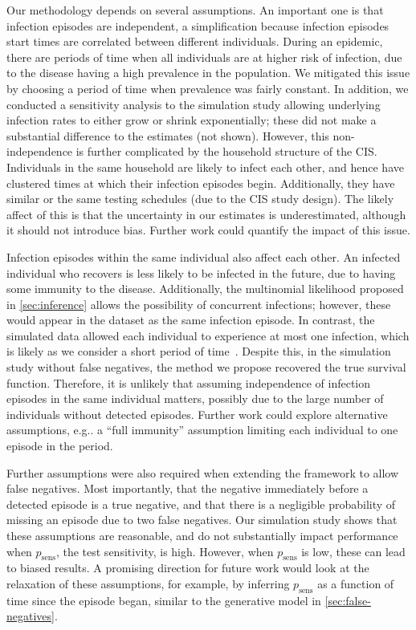 \documentclass[12pt]{article}
\makeatletter
\newcommand{\psens}{p_\text{sens}}
\DeclareRobustCommand\onedot{\futurelet\@let@token\@onedot}
\def\@onedot{\ifx\@let@token.\else.\null\fi\xspace}
\def\eg{e.g\onedot} \def\Eg{{E.g}\onedot}
\makeatother
\begin{document}
Our methodology depends on several assumptions.
An important one is that infection episodes are independent, a simplification because infection episodes start times are correlated between different individuals.
During an epidemic, there are periods of time when all individuals are at higher risk of infection, due to the disease having a high prevalence in the population.
We mitigated this issue by choosing a period of time when prevalence was fairly constant.
In addition, we conducted a sensitivity analysis to the simulation study allowing underlying infection rates to either grow or shrink exponentially; these did not make a substantial difference to the estimates (not shown).
However, this non-independence is further complicated by the household structure of the CIS.
Individuals in the same household are likely to infect each other, and hence have clustered times at which their infection episodes begin.
Additionally, they have similar or the same testing schedules (due to the CIS study design).
The likely affect of this is that the uncertainty in our estimates is underestimated, although it should not introduce bias.
Further work could quantify the impact of this issue.

Infection episodes within the same individual also affect each other.
An infected individual who recovers is less likely to be infected in the future, due to having some immunity to the disease.
Additionally, the multinomial likelihood proposed in \cref{sec:inference} allows the possibility of concurrent infections; however, these would appear in the dataset as the same infection episode.
In contrast, the simulated data allowed each individual to experience at most one infection, which is likely as we consider a short period of time~\citep{milneImmunity}.
Despite this, in the simulation study without false negatives, the method we propose recovered the true survival function.
Therefore, it is unlikely that assuming independence of infection episodes in the same individual matters, possibly due to the large number of individuals without detected episodes.
Further work could explore alternative assumptions, \eg a ``full immunity'' assumption limiting each individual to one episode in the period.

Further assumptions were also required when extending the framework to allow false negatives.
Most importantly, that the negative immediately before a detected episode is a true negative, and that there is a negligible probability of missing an episode due to two false negatives.
Our simulation study shows that these assumptions are reasonable, and do not substantially impact performance when $\psens$, the test sensitivity, is high.
However, when $\psens$ is low, these can lead to biased results.
A promising direction for future work would look at the relaxation of these assumptions, for example, by inferring $\psens$ as a function of time since the episode began, similar to the generative model in \cref{sec:false-negatives}.
\end{document}

